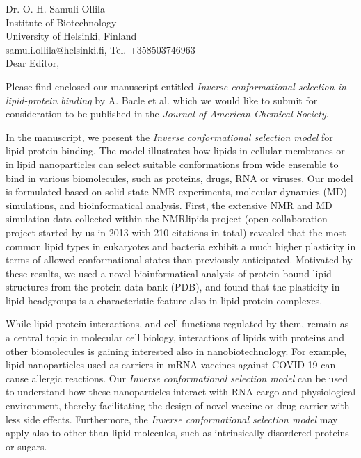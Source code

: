 \documentclass[11pt]{letter}
\begin{document}
\reversemarginpar
\pagestyle{empty}
\noindent Dr. O. H. Samuli Ollila \\
\noindent Institute of Biotechnology \\
\noindent University of Helsinki, Finland \\
\noindent samuli.ollila@helsinki.fi, Tel. +358503746963 \\


Dear Editor,

Please find enclosed our manuscript entitled
{\it Inverse conformational selection in lipid-protein binding}
by A. Bacle et al. which we would like to submit for consideration to be published in the \textit{Journal of American Chemical Society}.

In the manuscript, we present the {\it Inverse conformational selection model} for lipid-protein binding.
The model illustrates how lipids in cellular membranes or in lipid nanoparticles can select
suitable conformations from wide ensemble %
to bind in various biomolecules, such as proteins, drugs, RNA or viruses.
Our model is formulated based on solid state NMR experiments, molecular dynamics (MD) simulations,
and bioinformatical analysis.
First, the extensive NMR and MD simulation data collected within the NMRlipids project
(open collaboration project started by us in 2013
with 210 citations in total) revealed that 
the most common lipid types in eukaryotes and bacteria exhibit a much higher plasticity in
terms of allowed conformational states than previously anticipated.
Motivated by these results, 
we used a novel bioinformatical analysis of protein-bound lipid structures from the protein data bank (PDB),
and found that the plasticity in lipid headgroups is a characteristic feature also in lipid-protein complexes.

While lipid-protein interactions, and cell functions regulated by them,  remain
as a central topic in molecular cell biology, interactions of lipids with proteins and other biomolecules
is gaining interested also in nanobiotechnology. For example, lipid nanoparticles used as carriers
in mRNA vaccines against COVID-19 can cause allergic reactions.
Our {\it Inverse conformational selection model} can be used to understand how
these nanoparticles interact with RNA cargo and physiological environment,
thereby facilitating the design of novel vaccine or drug carrier with less side effects.
Furthermore, the {\it Inverse conformational selection model}
may apply also to other than lipid molecules, such as intrinsically disordered proteins or sugars.
\end{document}
